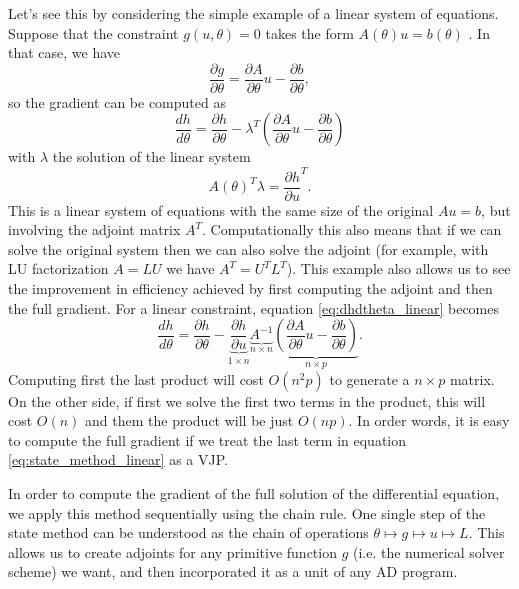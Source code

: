 \begin{example*}
Let's see this by considering the simple example of a linear system of equations. Suppose that the constraint $g(u, \theta)=0$ takes the form $A(\theta) u = b(\theta)$ \cite{Johnson}. In that case, we have
\begin{equation}
    \frac{\partial g}{\partial \theta} = \frac{\partial A }{\partial \theta} u - \frac{\partial b}{\partial \theta},
\end{equation}
so the gradient can be computed as 
\begin{equation}
    \frac{dh}{d\theta} = \frac{\partial h}{\partial \theta} - \lambda^T \left( \frac{\partial A }{\partial \theta} u - \frac{\partial b}{\partial \theta} \right)
    \label{eq:dhdtheta_linear}
\end{equation}
with $\lambda$ the solution of the linear system 
\begin{equation}
    A(\theta)^T \lambda = \frac{\partial h}{\partial u}^T.
\end{equation}
This is a linear system of equations with the same size of the original $Au = b$, but involving the adjoint matrix $A^T$. Computationally this also means that if we can solve the original system then we can also solve the adjoint (for example, with LU factorization $A=LU$ we have $A^T=U^TL^T$).
This example also allows us to see the improvement  in efficiency achieved by first computing the adjoint and then the full gradient. For a linear constraint, equation \eqref{eq:dhdtheta_linear} becomes
\begin{equation}
    \frac{dh}{d\theta} = \frac{\partial h}{\partial \theta} - 
    \underbrace{\frac{\partial h}{\partial u}}_{1 \times n}
    \underbrace{A^{-1}}_{n \times n} 
    \underbrace{\left( \frac{\partial A }{\partial \theta} u - \frac{\partial b}{\partial \theta} \right)}_{n \times p}.
    \label{eq:state_method_linear}
\end{equation}
Computing first the last product will cost $O(n^2p)$ to generate a $n \times p$ matrix. On the other side, if first we solve the first two terms in the product, this will cost $O(n)$ and them the product will be just $O(np)$. In order words, it is easy to compute the full gradient if we treat the last term in equation \eqref{eq:state_method_linear} as a VJP. 
\end{example*}

In order to compute the gradient of the full solution of the differential equation, we apply this method sequentially using the chain rule. One single step of the state method can be understood as the chain of operations $\theta \mapsto g \mapsto u \mapsto L$. This allows us to create adjoints for any primitive function $g$ (i.e. the numerical solver scheme) we want, and then incorporated it as a unit of any AD program. 